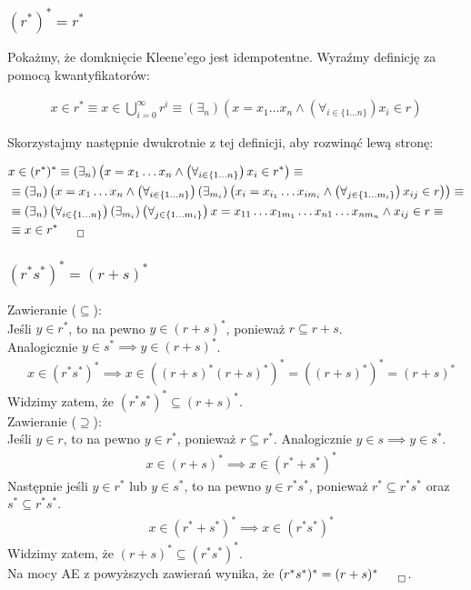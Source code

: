 \documentclass[12pt]{article}
\begin{document}
\subsubsection{$(r^{*})^{*} = r^{*}$}

Pokażmy, że domknięcie Kleene'ego jest idempotentne. Wyraźmy definicję za pomocą kwantyfikatorów:

\begin{align}
    x\in r^{*} \equiv x\in \bigcup_{i=0}^{\infty} r^i \equiv \left(\exists_n\right) 
    \left(x=x_1\dots x_n \land \left(\forall_{i\in \{1\dots n\}}\right) x_i \in r\right)
\end{align}

\noindent
Skorzystajmy następnie dwukrotnie z tej definicji, aby rozwinąć lewą stronę:

\begin{align}
    &x\in (r^{*})^{*} \equiv \left(\exists_n\right)\left(x=x_1\dots x_n \land \left(\forall_{i\in \{1\dots n\}}\right) x_i \in r^{*}\right) \equiv\\
    &\equiv \left(\exists_n\right)\left(x=x_1\dots x_n \land \left(\forall_{i\in \{1\dots n\}}\right) \left(\exists_{m_i}\right) \left(x_i = x_{i_1}\dots x_{im_i} \land \left(\forall_{j\in \{1\dots m_i\}}\right) x_{ij} \in r\right)\right) \equiv\\
    &\equiv \left(\exists_n\right)\left(\forall_{i\in \{1\dots n\}}\right)\left(\exists_{m_i}\right)\left(\forall_{j\in \{1\dots m_i\}}\right) x=x_{11}\dots x_{1m_1}\dots x_{n1}\dots x_{nm_n} \land x_{ij} \in r \equiv\\
    &\equiv x\in r^{*}_{\qed}
\end{align}

\subsubsection{$(r^{*}s^{*})^{*} = (r+s)^{*}$}

Zawieranie ($\subseteq$):\\
\noindent
Jeśli $y\in r^{*}$, to na pewno $y\in (r+s)^{*}$, ponieważ $r \subseteq r+s$.\\ Analogicznie $y\in s^{*} \implies y\in (r+s)^{*}$.
\begin{align}
    &x\in (r^{*}s^{*})^{*} \implies x\in ((r+s)^{*}(r+s)^{*})^{*} = ((r+s)^{*})^{*} = (r+s)^{*}
\end{align}
Widzimy zatem, że $(r^{*}s^{*})^{*} \subseteq (r+s)^{*}$.\\

\noindent
Zawieranie ($\supseteq$):\\
\noindent
Jeśli $y\in r$, to na pewno $y\in r^{*}$, ponieważ $r \subseteq r^{*}$. Analogicznie $y\in s \implies y\in s^{*}$.
\begin{align}
    &x\in (r+s)^{*} \implies x\in (r^{*}+s^{*})^{*}
\end{align}
Następnie jeśli $y\in r^{*}$ lub $y\in s^{*}$, to na pewno $y\in r^{*}s^{*}$, ponieważ $r^{*} \subseteq r^{*}s^{*}$ oraz $s^{*} \subseteq r^{*}s^{*}$.
\begin{align}
    &x\in (r^{*}+s^{*})^{*} \implies x\in (r^{*}s^{*})^{*}
\end{align}
Widzimy zatem, że $(r+s)^{*} \subseteq (r^{*}s^{*})^{*}$.\\

\noindent
Na mocy AE z powyższych zawierań wynika, że $(r^{*}s^{*})^{*} = (r+s)^{*}_{\qed}$.
\end{document}
